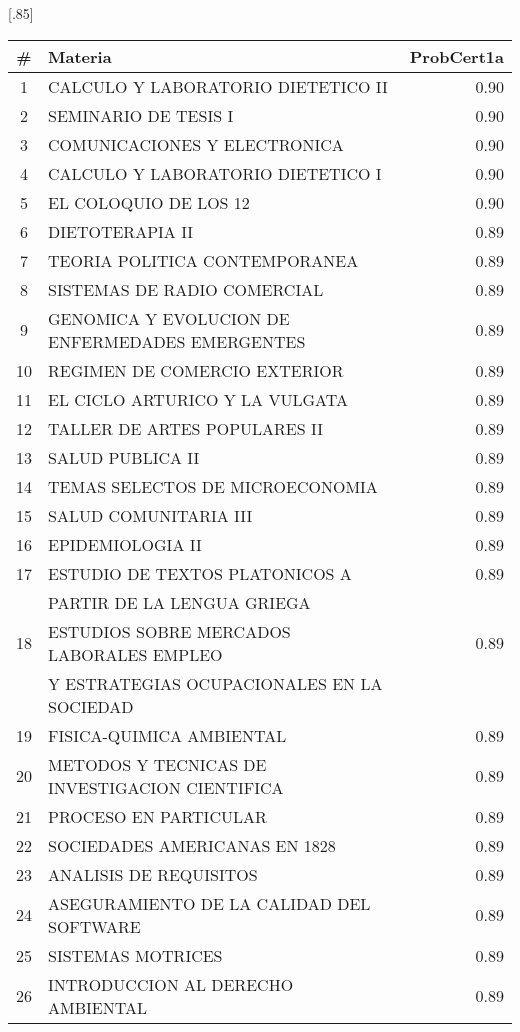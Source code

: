 \documentclass[12pt]{article}
\begin{document}
\begin{table}[ht]
\centering
\scalebox{0.75}[.85]{
\begin{tabular}{clr}
  \hline
   \# & Materia & ProbCert1a \\
  \hline
  1 & CALCULO Y LABORATORIO DIETETICO II & 0.90 \\
  2 & SEMINARIO DE TESIS I & 0.90 \\
  3 & COMUNICACIONES Y ELECTRONICA & 0.90 \\
  4 & CALCULO Y LABORATORIO DIETETICO I & 0.90 \\
  5 & EL COLOQUIO DE LOS 12 & 0.90 \\
  6 & DIETOTERAPIA II & 0.89 \\
  7 & TEORIA POLITICA CONTEMPORANEA & 0.89 \\
  8 & SISTEMAS DE RADIO COMERCIAL & 0.89 \\
  9 & GENOMICA Y EVOLUCION DE ENFERMEDADES EMERGENTES & 0.89 \\
  10 & REGIMEN DE COMERCIO EXTERIOR & 0.89 \\
  11 & EL CICLO ARTURICO Y LA VULGATA & 0.89 \\
  12 & TALLER DE ARTES POPULARES II & 0.89 \\
  13 & SALUD PUBLICA II & 0.89 \\
  14 & TEMAS SELECTOS DE MICROECONOMIA & 0.89 \\
  15 & SALUD COMUNITARIA III & 0.89 \\
  16 & EPIDEMIOLOGIA II & 0.89 \\
  17 & ESTUDIO DE TEXTOS PLATONICOS A  & 0.89 \\
   & PARTIR DE LA LENGUA GRIEGA &  \\
  18 & ESTUDIOS SOBRE MERCADOS LABORALES EMPLEO & 0.89 \\
    & Y ESTRATEGIAS OCUPACIONALES EN LA SOCIEDAD &  \\
  19 & FISICA-QUIMICA AMBIENTAL & 0.89 \\
  20 & METODOS Y TECNICAS DE INVESTIGACION CIENTIFICA & 0.89 \\
  21 & PROCESO EN PARTICULAR & 0.89 \\
  22 & SOCIEDADES AMERICANAS EN 1828 & 0.89 \\
  23 & ANALISIS DE REQUISITOS & 0.89 \\
  24 & ASEGURAMIENTO DE LA CALIDAD DEL SOFTWARE & 0.89 \\
  25 & SISTEMAS MOTRICES & 0.89 \\
  26 & INTRODUCCION AL DERECHO AMBIENTAL & 0.89 \\

\end{tabular}}
\end{table}
\end{document}
